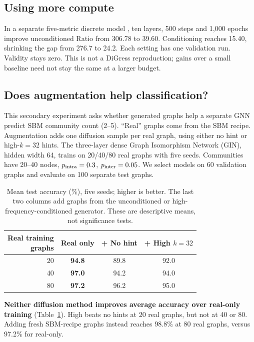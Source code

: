 \documentclass[11pt]{article}
\begin{document}
\subsection{Using more compute}
\label{sec:budget}
In a separate five-metric discrete model \citep{austin2021d3pm}, ten layers, 500 steps and
1,000 epochs improve unconditioned Ratio from 306.78 to 39.60. Conditioning reaches 15.40,
shrinking the gap from 276.7 to 24.2. Each setting has one validation run. Validity stays zero.
This is not a DiGress reproduction; gains over a small baseline need not stay the same at
a larger budget.

\subsection{Does augmentation help classification?}
\label{sec:downstream}
This secondary experiment asks whether generated graphs help a separate GNN predict SBM
community count (2--5). ``Real'' graphs come from the SBM recipe. Augmentation adds one diffusion sample per real
graph, using either no hint or high-$k{=}32$ hints. The three-layer dense Graph Isomorphism
Network (GIN), hidden width 64, trains on 20/40/80 real graphs with five seeds. Communities
have 20--40 nodes, $p_{\rm intra}=0.3$, $p_{\rm inter}=0.05$. We select models on 60 validation
graphs and evaluate on 100 separate test graphs.

\begin{table}[t]
\centering\small
\setlength{\tabcolsep}{4pt}
\begin{tabular}{rccc}
\toprule
\shortstack{Real training\\graphs} & Real only & + No hint & \shortstack{+ High\\$k{=}32$} \\
\midrule
20 & \textbf{94.8} & 89.8 & 92.0 \\
40 & \textbf{97.0} & 94.2 & 94.0 \\
80 & \textbf{97.2} & 96.2 & 95.0 \\
\bottomrule
\end{tabular}
\caption{Mean test accuracy (\%), five seeds; higher is better. The last two columns add
graphs from the unconditioned or high-frequency-conditioned generator. These are descriptive
means, not significance tests.}
\label{tab:downstream}
\end{table}

\textbf{Neither diffusion method improves average accuracy over real-only training}
(Table~\ref{tab:downstream}). High beats no hints at 20 real graphs, but not at 40 or 80.
Adding fresh SBM-recipe graphs instead reaches 98.8\% at 80 real graphs, versus 97.2\%
for real-only.
\end{document}
